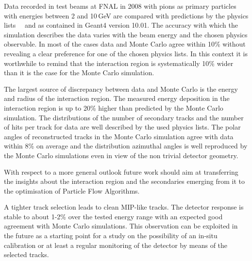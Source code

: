 Data recorded in test beams at FNAL in 2008 with pions as primary particles with energies between 2 and 10\,GeV are compared with predictions by the physics lists \qgsp\, \ftfp\ and \qbbc as contained in {\sc Geant4} version 10.01. The accuracy with which the simulation describes the data varies with the beam energy and the chosen physics observable. In most of the cases data and Monte Carlo agree within 10\% without revealing a clear preference for one of the chosen physics lists. In this context it is worthwhile to remind that the interaction region is systematically 10\% wider than it is the case for the Monte Carlo simulation.

The largest source of discrepancy between data and Monte Carlo is the energy and radius of the interaction region. The measured energy deposition in the interaction region is up to 20\% higher than predicted by the Monte Carlo simulation.
The distributions of the number of secondary tracks and the number of hits per track for data are well described by the used physics lists. The polar angles of reconstructed tracks in the Monte Carlo simulation agree with data within 8\% on average and the distribution azimuthal angles is well reproduced by the Monte Carlo simulations even in view of the non trivial detector geometry.


With respect to a more general outlook future work should aim at transferring the insights about the interaction region and the secondaries emerging from it to the optimisation of Particle Flow Algorithms.

A tighter track selection leads to clean MIP-like tracks. The detector response is stable to about 1-2\% over the tested energy range with an expected good agreement with Monte Carlo simulations. This observation can be exploited in the future as a starting point for a study on the possibility of an in-situ calibration or at least a regular monitoring of the detector by means of the selected tracks.  


